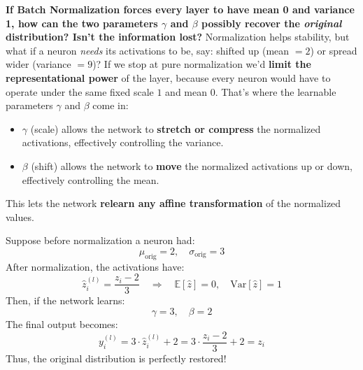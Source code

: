 \begin{enumerate}
    \highspace
    \textcolor{Green3}{ \textbf{If Batch Normalization forces every layer to have mean 0 and variance 1, how can the two parameters $\gamma$ and $\beta$ possibly recover the \emph{original} distribution? Isn't the information lost?}} Normalization helps stability, but what if a neuron \emph{needs} its activations to be, say: shifted up (mean $=2$) or spread wider (variance $=9$)? If we stop at pure normalization we'd \textbf{limit the representational power} of the layer, because every neuron would have to operate under the same fixed scale $1$ and mean $0$. That's where the learnable parameters $\gamma$ and $\beta$ come in:
    \begin{itemize}
        \item $\gamma$ (scale) allows the network to \textbf{stretch or compress} the normalized activations, effectively controlling the variance.
        \item $\beta$ (shift) allows the network to \textbf{move} the normalized activations up or down, effectively controlling the mean.
    \end{itemize}
    This lets the network \textbf{relearn any affine transformation} of the normalized values.

    \begin{examplebox}
        Suppose before normalization a neuron had:
        \begin{equation*}
            \mu_{\text{orig}} = 2, \quad \sigma_{\text{orig}} = 3
        \end{equation*}
        After normalization, the activations have:
        \begin{equation*}
            \hat{z}_i^{(l)} = \dfrac{z_i - 2}{3} \quad \Rightarrow \quad \mathbb{E}[\hat{z}] = 0, \quad \mathrm{Var}[\hat{z}] = 1
        \end{equation*}
        Then, if the network learns:
        \begin{equation*}
            \gamma = 3, \quad \beta = 2
        \end{equation*}
        The final output becomes:
        \begin{equation*}
            y_i^{(l)} = 3 \cdot \hat{z}_i^{(l)} + 2 = 3 \cdot \dfrac{z_i - 2}{3} + 2 = z_i
        \end{equation*}
        Thus, the original distribution is perfectly restored!
    \end{examplebox}
\end{enumerate}

